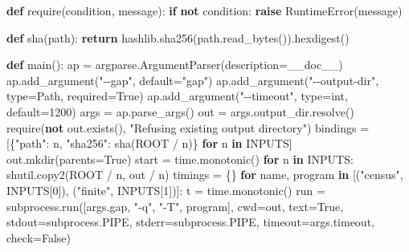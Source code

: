 \documentclass[
  10pt,
  letterpaper,
]{article}
\newenvironment{Shaded}{}{}
\newcommand{\BuiltInTok}[1]{\textcolor[rgb]{0.00,0.50,0.00}{#1}}
\newcommand{\ControlFlowTok}[1]{\textcolor[rgb]{0.00,0.44,0.13}{\textbf{#1}}}
\newcommand{\DecValTok}[1]{\textcolor[rgb]{0.25,0.63,0.44}{#1}}
\newcommand{\KeywordTok}[1]{\textcolor[rgb]{0.00,0.44,0.13}{\textbf{#1}}}
\newcommand{\NormalTok}[1]{#1}
\newcommand{\OperatorTok}[1]{\textcolor[rgb]{0.40,0.40,0.40}{#1}}
\newcommand{\PreprocessorTok}[1]{\textcolor[rgb]{0.74,0.48,0.00}{#1}}
\newcommand{\StringTok}[1]{\textcolor[rgb]{0.25,0.44,0.63}{#1}}
\newcommand{\VariableTok}[1]{\textcolor[rgb]{0.10,0.09,0.49}{#1}}
\begin{document}
\begin{Shaded}
\begin{Highlighting}[]
\KeywordTok{def}\NormalTok{ require(condition, message):}
    \ControlFlowTok{if} \KeywordTok{not}\NormalTok{ condition:}
        \ControlFlowTok{raise} \PreprocessorTok{RuntimeError}\NormalTok{(message)}


\KeywordTok{def}\NormalTok{ sha(path):}
    \ControlFlowTok{return}\NormalTok{ hashlib.sha256(path.read\_bytes()).hexdigest()}


\KeywordTok{def}\NormalTok{ main():}
\NormalTok{    ap }\OperatorTok{=}\NormalTok{ argparse.ArgumentParser(description}\OperatorTok{=}\NormalTok{\_\_doc\_\_)}
\NormalTok{    ap.add\_argument(}\StringTok{"{-}{-}gap"}\NormalTok{, default}\OperatorTok{=}\StringTok{"gap"}\NormalTok{)}
\NormalTok{    ap.add\_argument(}\StringTok{"{-}{-}output{-}dir"}\NormalTok{, }\BuiltInTok{type}\OperatorTok{=}\NormalTok{Path, required}\OperatorTok{=}\VariableTok{True}\NormalTok{)}
\NormalTok{    ap.add\_argument(}\StringTok{"{-}{-}timeout"}\NormalTok{, }\BuiltInTok{type}\OperatorTok{=}\BuiltInTok{int}\NormalTok{, default}\OperatorTok{=}\DecValTok{1200}\NormalTok{)}
\NormalTok{    args }\OperatorTok{=}\NormalTok{ ap.parse\_args()}
\NormalTok{    out }\OperatorTok{=}\NormalTok{ args.output\_dir.resolve()}
\NormalTok{    require(}\KeywordTok{not}\NormalTok{ out.exists(), }\StringTok{"Refusing existing output directory"}\NormalTok{)}
\NormalTok{    bindings }\OperatorTok{=}\NormalTok{ [\{}\StringTok{"path"}\NormalTok{: n, }\StringTok{"sha256"}\NormalTok{: sha(ROOT }\OperatorTok{/}\NormalTok{ n)\} }\ControlFlowTok{for}\NormalTok{ n }\KeywordTok{in}\NormalTok{ INPUTS]}
\NormalTok{    out.mkdir(parents}\OperatorTok{=}\VariableTok{True}\NormalTok{)}
\NormalTok{    start }\OperatorTok{=}\NormalTok{ time.monotonic()}
    \ControlFlowTok{for}\NormalTok{ n }\KeywordTok{in}\NormalTok{ INPUTS:}
\NormalTok{        shutil.copy2(ROOT }\OperatorTok{/}\NormalTok{ n, out }\OperatorTok{/}\NormalTok{ n)}
\NormalTok{    timings }\OperatorTok{=}\NormalTok{ \{\}}
    \ControlFlowTok{for}\NormalTok{ name, program }\KeywordTok{in}\NormalTok{ [(}\StringTok{"census"}\NormalTok{, INPUTS[}\DecValTok{0}\NormalTok{]), (}\StringTok{"finite"}\NormalTok{, INPUTS[}\DecValTok{1}\NormalTok{])]:}
\NormalTok{        t }\OperatorTok{=}\NormalTok{ time.monotonic()}
\NormalTok{        run }\OperatorTok{=}\NormalTok{ subprocess.run([args.gap, }\StringTok{"{-}q"}\NormalTok{, }\StringTok{"{-}T"}\NormalTok{, program], cwd}\OperatorTok{=}\NormalTok{out, text}\OperatorTok{=}\VariableTok{True}\NormalTok{, stdout}\OperatorTok{=}\NormalTok{subprocess.PIPE, stderr}\OperatorTok{=}\NormalTok{subprocess.PIPE, timeout}\OperatorTok{=}\NormalTok{args.timeout, check}\OperatorTok{=}\VariableTok{False}\NormalTok{)}

\end{Highlighting}
\end{Shaded}
\end{document}
